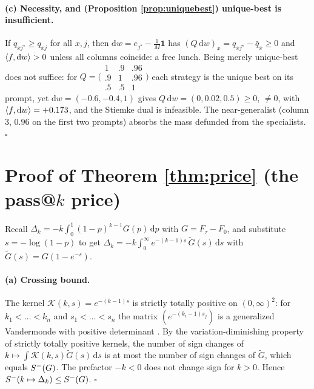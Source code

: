 \paragraph{(c) Necessity, and (Proposition \ref{prop:uniquebest}) unique-best is
insufficient.}
If $q_{xj^\star}\ge q_{xj}$ for all $x,j$, then $\mathrm dw=e_{j^\star}-\tfrac1M
\mathbf 1$ has $(Q\,\mathrm dw)_x=q_{xj^\star}-\bar q_x\ge0$ and $\langle f, \mathrm
dw\rangle>0$ unless all columns coincide: a free lunch. Being merely unique-best does
not suffice: for
$Q=\bigl(\begin{smallmatrix}1&.9&.96\\.9&1&.96\\.5&.5&1\end{smallmatrix}\bigr)$
each strategy is the unique best on its prompt, yet $\mathrm dw=(-0.6,-0.4,1)$
gives $Q\,\mathrm dw=(0,0.02,0.5)\ge0$, $\ne0$, with $\langle f, \mathrm
dw\rangle=+0.173$, and the Stiemke dual is infeasible. The near-generalist (column 3,
$0.96$ on the first two prompts) absorbs the mass defunded from the specialists.
$\square$

\section{Proof of Theorem \ref{thm:price} (the pass@$k$ price)}

Recall $\Delta_k=-k\int_0^1(1-p)^{k-1}G(p)\,\mathrm dp$ with $G=F_\tau-F_0$, and
substitute $s=-\log(1-p)$ to get $\Delta_k=-k\int_0^\infty
e^{-(k-1)s}\,\tilde G(s)\,\mathrm ds$ with $\tilde G(s)=G(1-e^{-s})$.

\paragraph{(a) Crossing bound.}
The kernel $\mathcal K(k,s)=e^{-(k-1)s}$ is strictly totally positive on
$(0,\infty)^2$: for $k_1<\dots<k_n$ and $s_1<\dots<s_n$ the matrix
$(e^{-(k_i-1)s_j})$ is a generalized Vandermonde with positive determinant
\citep{karlin68tp,schoenberg51pff}. By the variation-diminishing property of
strictly totally positive kernels, the number of sign changes of
$k\mapsto\int\mathcal K(k,s)\tilde G(s)\,\mathrm ds$ is at most the number of sign
changes of $\tilde G$, which equals $S^{-}(G)$. The prefactor $-k<0$ does not
change sign for $k>0$. Hence $S^{-}(k\mapsto\Delta_k)\le S^{-}(G)$. $\square$

